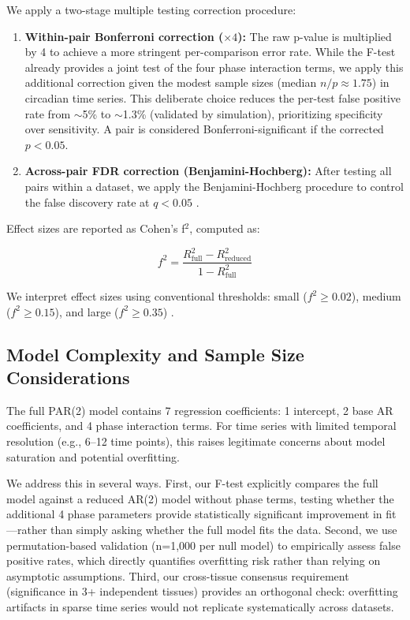 \documentclass[11pt,a4paper]{article}
\begin{document}
We apply a two-stage multiple testing correction procedure:

\begin{enumerate}
    \item \textbf{Within-pair Bonferroni correction ($\times 4$):} The raw p-value is multiplied by 4 to achieve a more stringent per-comparison error rate. While the F-test already provides a joint test of the four phase interaction terms, we apply this additional correction given the modest sample sizes (median $n/p \approx 1.75$) in circadian time series. This deliberate choice reduces the per-test false positive rate from $\sim$5\% to $\sim$1.3\% (validated by simulation), prioritizing specificity over sensitivity. A pair is considered Bonferroni-significant if the corrected $p < 0.05$.
    
    \item \textbf{Across-pair FDR correction (Benjamini-Hochberg):} After testing all pairs within a dataset, we apply the Benjamini-Hochberg procedure to control the false discovery rate at $q < 0.05$ \citep{benjamini1995controlling}.
\end{enumerate}

Effect sizes are reported as Cohen's f$^2$, computed as:

\begin{equation}
f^2 = \frac{R^2_{\text{full}} - R^2_{\text{reduced}}}{1 - R^2_{\text{full}}}
\end{equation}

We interpret effect sizes using conventional thresholds: small ($f^2 \geq 0.02$), medium ($f^2 \geq 0.15$), and large ($f^2 \geq 0.35$) \citep{cohen1988statistical}.

\subsection{Model Complexity and Sample Size Considerations}

The full PAR(2) model contains 7 regression coefficients: 1 intercept, 2 base AR coefficients, and 4 phase interaction terms. For time series with limited temporal resolution (e.g., 6--12 time points), this raises legitimate concerns about model saturation and potential overfitting.

We address this in several ways. First, our F-test explicitly compares the full model against a reduced AR(2) model without phase terms, testing whether the additional 4 phase parameters provide statistically significant improvement in fit---rather than simply asking whether the full model fits the data. Second, we use permutation-based validation (n=1,000 per null model) to empirically assess false positive rates, which directly quantifies overfitting risk rather than relying on asymptotic assumptions. Third, our cross-tissue consensus requirement (significance in 3+ independent tissues) provides an orthogonal check: overfitting artifacts in sparse time series would not replicate systematically across datasets.
\end{document}
